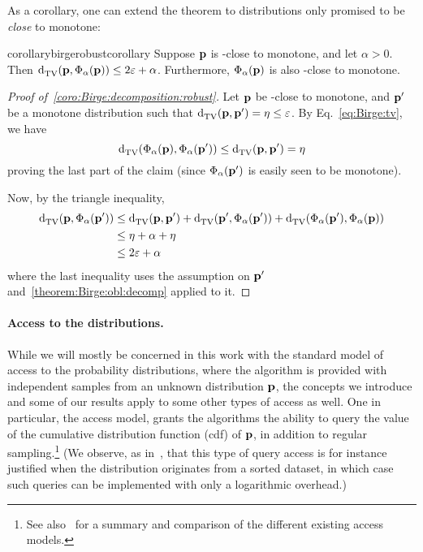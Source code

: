 \noindent As a corollary, one can extend the theorem to distributions only promised to be \emph{close} to monotone:
\begin{restatable}{corollary}{birgerobustcorollary}\label{coro:Birge:decomposition:robust}
    Suppose $\D$ is \eps-close to monotone, and let $\alpha > 0$. Then $\totalvardist{\D}{ \birge[\D]{\alpha} } \leq 2\eps + \alpha$. Furthermore,  $\birge[\D]{\alpha}$ is also \eps-close to monotone.
\end{restatable}
\begin{proof}[Proof of~\cref{coro:Birge:decomposition:robust}]
  Let $\D$ be \eps-close to monotone, and $\D^\prime$ be a monotone distribution such that $\totalvardist{\D}{\D^\prime} = \eta \leq \eps$. By Eq.~\eqref{eq:Birge:tv}, we have
  \begin{equation}\label{eqn:phialpha:cannot:increase:tv}
      \totalvardist{ \birge[\D]{\alpha} }{ \birge[\D^\prime]{\alpha} } \leq \totalvardist{\D}{\D^\prime} = \eta
  \end{equation}
  proving the last part of the claim  (since $\birge[\D^\prime]{\alpha}$ is easily seen to be monotone).

  \noindent Now, by the triangle inequality,
  \begin{align*}
      \totalvardist{\D}{ \birge[\D^\prime]{\alpha} } &\leq \totalvardist{\D}{\D^\prime} + \totalvardist{\D^\prime}{ \birge[\D^\prime]{\alpha} } + \totalvardist{ \birge[\D^\prime]{\alpha} }{ \birge[\D]{\alpha} } \\
      &\leq \eta + \alpha + \eta \\
      &\leq 2\eps+\alpha
  \end{align*}
  where the last inequality uses the assumption on $\D^\prime$ and~\cref{theorem:Birge:obl:decomp} applied to it.
\end{proof}
  
\paragraph{Access to the distributions.} While we will mostly be concerned in this work with the standard model of access to the probability distributions, where the algorithm is provided with independent samples from an unknown distribution $\D$, the concepts we introduce and some of our results apply to some other types of access as well. One in particular, the \Cdfsamp access model, grants the algorithms the ability to query the value of the cumulative distribution function (cdf) of $\D$, in addition to regular sampling.\footnote{See also~\cite{Canonne:15:Survey} for a summary and comparison of the different existing access models.} (We observe, as in~\cite{CR:14}, that this type of query access is for instance justified when the distribution originates from a sorted dataset, in which case such queries can be implemented with only a logarithmic overhead.)

